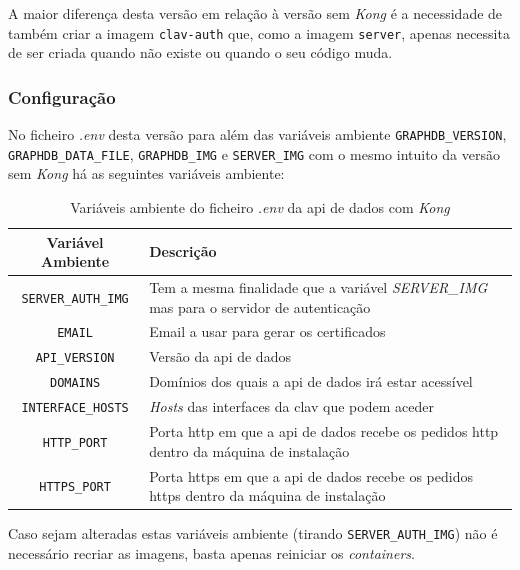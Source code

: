 A maior diferença desta versão em relação à versão sem \textit{Kong} é a necessidade de também criar a imagem \texttt{clav-auth} que, como a imagem \texttt{server}, apenas necessita de ser criada quando não existe ou quando o seu código muda.

\subsubsection{Configuração}

No ficheiro \textit{.env} desta versão para além das variáveis ambiente \texttt{GRAPHDB\_VERSION}, \texttt{GRAPHDB\_DATA\_FILE}, \texttt{GRAPHDB\_IMG} e \texttt{SERVER\_IMG} com o mesmo intuito da versão sem \textit{Kong} há as seguintes variáveis ambiente:

\begin{table}[H]
\fontsize{10}{12}\selectfont
\begin{tabularx}{\textwidth}{|c|X|}
    \hline
    Variável Ambiente & Descrição \\ \hline
    \texttt{SERVER\_AUTH\_IMG} & Tem a mesma finalidade que a variável \textit{SERVER\_IMG} mas para o servidor de autenticação \\ \hline
    \texttt{EMAIL} & Email a usar para gerar os certificados \\ \hline
    \texttt{API\_VERSION} & Versão da \acrshort{api} de dados \\ \hline
    \texttt{DOMAINS} & Domínios dos quais a \acrshort{api} de dados irá estar acessível \\ \hline
    \texttt{INTERFACE\_HOSTS} & \textit{Hosts} das interfaces da \acrshort{clav} que podem aceder \\ \hline
    \texttt{HTTP\_PORT} & Porta \acrshort{http} em que a \acrshort{api} de dados recebe os pedidos \acrshort{http} dentro da máquina de instalação \\ \hline
    \texttt{HTTPS\_PORT} & Porta \acrshort{https} em que a \acrshort{api} de dados recebe os pedidos \acrshort{https} dentro da máquina de instalação \\ \hline
\end{tabularx}
\caption{Variáveis ambiente do ficheiro \textit{.env} da \acrshort{api} de dados com \textit{Kong}}
\end{table}

Caso sejam alteradas estas variáveis ambiente (tirando \texttt{SERVER\_AUTH\_IMG}) não é necessário recriar as imagens, basta apenas reiniciar os \textit{containers}.


